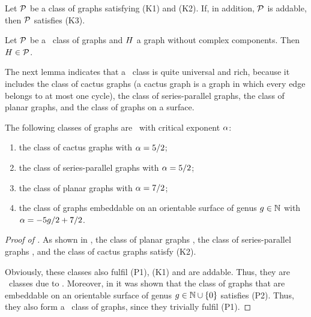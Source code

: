 \begin{lem}\label{CBlem:k3}
Let $\mathcal{P}$ be a class of graphs satisfying (K1) and (K2). If, in addition, $\mathcal{P}$ is addable, then $\mathcal{P}$ satisfies (K3).
\end{lem}

\begin{lem}\label{CBlem:k4}
Let $\mathcal{P}$ be a \pl\ class of graphs and $H$ a graph without complex components. Then $H \in \mathcal{P}$.
\end{lem}

The next lemma indicates that a \pl\ class is quite universal and rich, because it includes the class of cactus graphs (a cactus graph is a graph in which every edge belongs to at most one cycle), the class of series-parallel graphs, the class of planar graphs, and the class of graphs on a surface.

\begin{lem}\label{CBlem:planar_like}
The following classes of graphs are \pl\ with critical exponent $\alpha$:
\begin{enumerate}
\item the class of cactus graphs with $\alpha=5/2$;
\item the class of series-parallel graphs with $\alpha=5/2$;
\item \label{CBlem:planar_like_1} the class of planar graphs with $\alpha=7/2$;
\item the class of graphs embeddable on an orientable surface of genus $g \in \mathbb{N}$ with $\alpha=-5g/2+7/2$.
\end{enumerate}
\end{lem}

\begin{proof}[Proof of ]
As shown in \cite{KangLuczak2012, Mosshammer2013, KangMissethan2020}, the class of planar graphs \cite{KangLuczak2012}, the class of series-parallel graphs \cite{Mosshammer2013}, and the class of cactus graphs \cite{KangMissethan2020} satisfy (K2).
 
Obviously, these classes also fulfil (P1), (K1) and are addable. Thus, they are \pl\ classes due to . Moreover, in \cite{KangMosshammerSpruessel2020} it was shown that the class of graphs that are embeddable on an orientable surface of genus $g\in \mathbb{N}\cup\{0\}$ satisfies (P2). Thus, they also form a \pl\ class of graphs, since they trivially fulfil (P1).
\end{proof}


